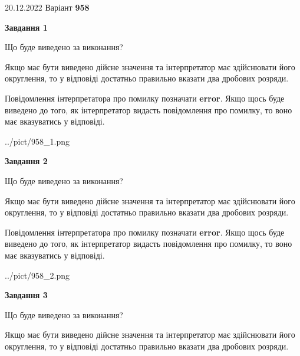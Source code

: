 \documentclass[12pt, ukrainian]{article}
\begin{document}
{20.12.2022 Варіант \No \textbf { 958 }\par}
{
\begin {Large}

{\begin {center}\textbf{Завдання 1}\end {center}}\par
Що буде виведено за виконання? \par

Якщо має бути виведено дійсне значення та інтерпретатор має здійснювати його округлення, 
то у відповіді достатньо правильно вказати два дробових розряди.

Повідомлення інтерпретатора про помилку позначати \textbf{error}.
Якщо щось буде виведено до того, як інтерпретатор видасть повідомлення про помилку, 
то воно має вказуватись у відповіді. \par

\begin{center}
	{../pict/958_1.png}
\end{center}
\newpage

{\begin {center}\textbf{Завдання 2}\end {center}}\par
Що буде виведено за виконання? \par

Якщо має бути виведено дійсне значення та інтерпретатор має здійснювати його округлення, 
то у відповіді достатньо правильно вказати два дробових розряди.

Повідомлення інтерпретатора про помилку позначати \textbf{error}.
Якщо щось буде виведено до того, як інтерпретатор видасть повідомлення про помилку, 
то воно має вказуватись у відповіді. \par

\begin{center}
	{../pict/958_2.png}
\end{center}
\newpage

{\begin {center}\textbf{Завдання 3}\end {center}}\par
Що буде виведено за виконання? \par

Якщо має бути виведено дійсне значення та інтерпретатор має здійснювати його округлення, 
то у відповіді достатньо правильно вказати два дробових розряди.


\end{Large}}
\end{document}
